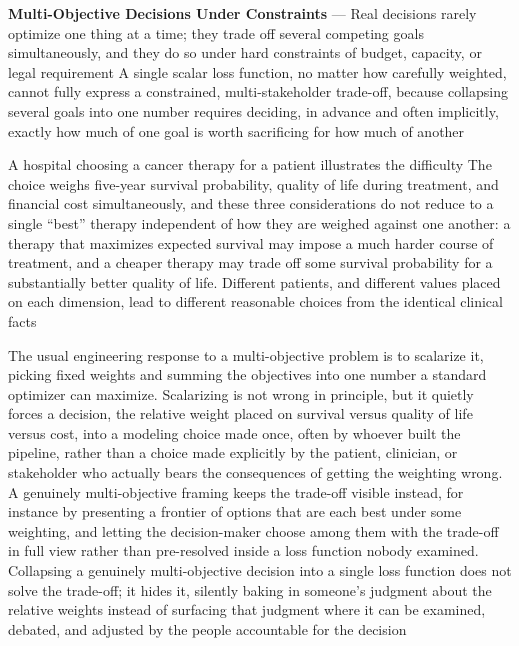 \textbf{Multi-Objective Decisions Under Constraints} --- Real decisions rarely
optimize one thing at a time; they trade off several competing goals simultaneously,
and they do so under hard constraints of budget, capacity, or legal requirement
A single scalar loss function, no matter how carefully weighted, cannot fully express
a constrained, multi-stakeholder trade-off, because collapsing several goals into
one number requires deciding, in advance and often implicitly, exactly how much of
one goal is worth sacrificing for how much of another

A hospital choosing a cancer therapy for a patient illustrates the difficulty
The choice weighs five-year survival probability, quality of life during treatment,
and financial cost simultaneously, and these three considerations do not reduce to
a single ``best'' therapy independent of how they are weighed against one another:
a therapy that maximizes expected survival may impose a much harder course of
treatment, and a cheaper therapy may trade off some survival probability for a substantially
better quality of life. Different patients, and different values placed on each dimension,
lead to different reasonable choices from the identical clinical facts

The usual engineering response to a multi-objective problem is to scalarize it,
picking fixed weights and summing the objectives into one number a standard
optimizer can maximize. Scalarizing is not wrong in principle, but it quietly
forces a decision, the relative weight placed on survival versus quality of life
versus cost, into a modeling choice made once, often by whoever built the pipeline,
rather than a choice made explicitly by the patient, clinician, or stakeholder
who actually bears the consequences of getting the weighting wrong. A genuinely multi-objective
framing keeps the trade-off visible instead, for instance by presenting a
frontier of options that are each best under some weighting, and letting the decision-maker
choose among them with the trade-off in full view rather than pre-resolved inside
a loss function nobody examined. Collapsing a genuinely multi-objective decision
into a single loss function does not solve the trade-off; it hides it, silently
baking in someone's judgment about the relative weights instead of surfacing
that judgment where it can be examined, debated, and adjusted by the people
accountable for the decision

